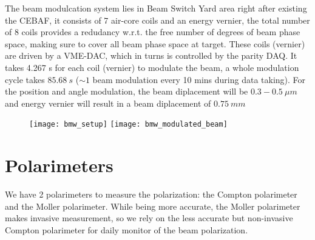 The beam modulcation system lies in Beam Switch Yard area right after existing 
the CEBAF, it consists of 7 air-core coils and an energy vernier, the total 
number of 8 coils provides a redudancy w.r.t. the free number of degrees 
of beam phase space, making sure to cover all beam phase space at target.  
These coils (vernier) are driven by a VME-DAC, which in turns is controlled by the parity DAQ.
It takes 4.267 s for each coil (vernier) to modulate the beam, a whole 
modulation cycle takes $85.68 \ s$ ($\sim 1$ beam modulation every 10 mins during
data taking). For the position and angle modulation, the beam diplacement will
be $0.3-0.5\ \mu m$ and energy vernier will result in a beam diplacement of $0.75 \ mm$
\begin{figure}[h!]
    \centering
    \texttt{[image: bmw\_setup]}
    \texttt{[image: bmw\_modulated\_beam]}
\end{figure}

\section{Polarimeters}
We have 2 polarimeters to measure the polarization: the Compton polarimeter and
the Moller polarimeter. While being more accurate, the Moller polarimeter makes
invasive measurement, so we rely on the less accurate but non-invasive Compton
polarimeter for daily monitor of the beam polarization.

